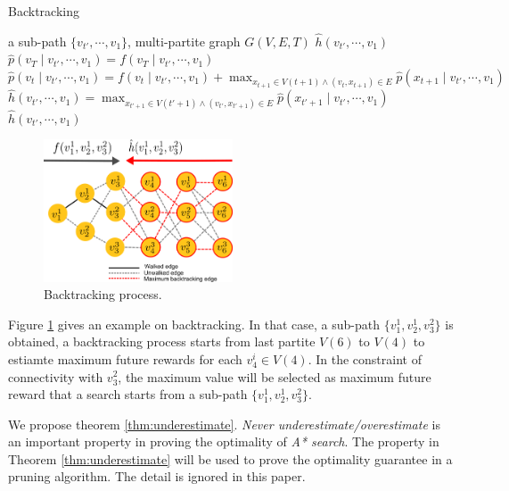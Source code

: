 \documentclass[12pt]{article}
\begin{document}
\begin{algorithm}
\caption{Backtracking}
\label{alg:Backtrack}
\begin{algorithmic}
\REQUIRE
a sub-path $ \{ v_{t'} , \cdots , v_{1} \} $, multi-partite graph $ G(V, E, T) $
\ENSURE $ \hat{h}( v_{t'} , \cdots , v_{1} ) $ \\
\STATE $ \hat{p}(v_{T} \mid v_{t'} , \cdots , v_{1} ) = f(v_{T} \mid v_{t'} , \cdots , v_{1} ) $
\ELSE
\STATE $ \hat{p}(v_{t} \mid v_{t'} , \cdots , v_{1} ) = f(v_{t} \mid v_{t'} , \cdots , v_{1} ) + \max_{ { x_{t+1} \in V(t+1) } \land { (v_{t}, x_{t+1}) \in E } } \hat{p}(x_{t+1} \mid v_{t'} , \cdots , v_{1} ) $
\ENDIF
\ENDFOR
\ENDFOR
\STATE  $ \hat{h}( v_{t'} , \cdots , v_{1} ) = \max_{ {x_{t'+1} \in V(t'+1)} \land {(v_{t'}, x_{t'+1}) \in E} } \hat{p}(x_{t'+1} \mid v_{t'} , \cdots , v_{1} ) $
\RETURN $ \hat{h}( v_{t'} , \cdots , v_{1} )  $
\end{algorithmic}
\end{algorithm}


\begin{figure}[htbp]
\centering
\includegraphics[width=0.5\textwidth]{./backtracking}
\caption{Backtracking process.}
\label{fig:backtracking}
\end{figure}

Figure \ref{fig:backtracking} gives an example on backtracking.
In that case, a sub-path $ \{ v^{1}_{1} , v^{1}_{2} , v^{2}_{3} \} $ is obtained, a backtracking process starts from last partite $ V(6) $ to $ V(4) $ to estiamte maximum future rewards for each $ v^{i}_{4} \in V(4) $.
In the constraint of connectivity with $ v^{2}_{3} $, the maximum value will be selected as maximum future reward that a search starts from a sub-path $ \{ v^{1}_{1} , v^{1}_{2} , v^{2}_{3} \} $. 


We propose theorem \ref{thm:underestimate}. \emph{Never underestimate/overestimate} is an important property in proving the optimality of \emph{A* search}. The property in Theorem \ref{thm:underestimate} will be used to prove the optimality guarantee in a pruning algorithm. The detail is ignored in this paper.
\end{document}
